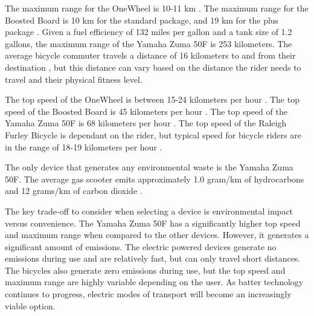 The maximum range for the OneWheel is 10-11 km \cite{wheelcost}.
The maximum range for the Boosted Board is 10 km for the standard package, and 19 km for the plus package \cite{boardcost}.
Given a fuel efficiency of 132 miles per gallon and a tank size of 1.2 gallons, the maximum range of the Yamaha Zuma 50F is 253 kilometers.
The average bicycle commuter travels a distance of 16 kilometers to and from their destination \cite{BikePaper}, but this distance can vary based on the distance the rider needs to travel and their physical fitness level.
\par
The top speed of the OneWheel is between 15-24 kilometers per hour \cite{wheelcost}.
The top speed of the Boosted Board is 45 kilometers per hour \cite{boardcost}.
The top speed of the Yamaha Zuma 50F is 68 kilometers per hour \cite{Yamaha}.
The top speed of the Raleigh Furley Bicycle is dependant on the rider, but typical speed for bicycle riders are in the range of 18-19 kilometers per hour \cite{bikespeed}.
\par
The only device that generates any environmental waste is the Yamaha Zuma 50F. The average gas scooter emits approximately 1.0 gram/km of hydrocarbons and 12 grams/km of carbon dioxide \cite{emissions}.
\par
The key trade-off to consider when selecting a device is environmental impact versus convenience.
The Yamaha Zuma 50F has a significantly higher top speed and maximum range when compared to the other devices. 
However, it generates a significant amount of emissions. The electric powered devices generate no emissions during use and are relatively fast, but can only travel short distances. 
The bicycles also generate zero emissions during use, but the top speed and maximum range are highly variable depending on the user.
As batter technology continues to progress, electric modes of transport will become an increasingly viable option.